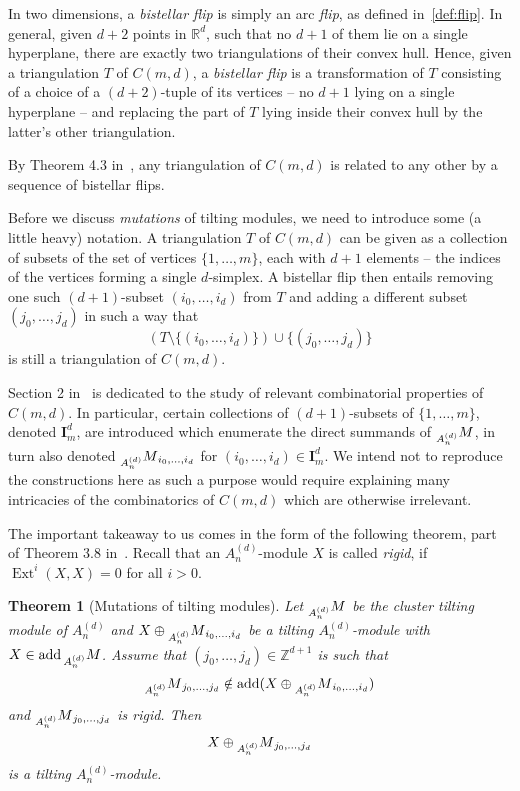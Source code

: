 \documentclass[a4paper,oneside,svgnames,draft]{amsart}
\theoremstyle{plain}
\newtheorem{theorem}{Theorem}[section]
\theoremstyle{definition}
\DeclareMathOperator{\ext}{Ext}
\DeclareMathOperator{\add}{add}
\begin{document}
 In two dimensions, a \emph{bistellar flip} is simply an arc \emph{flip}, as
 defined in~\cref{def:flip}. In general, given $d+2$ points in $\mathbb{R}^{d}$,
 such that no $d+1$ of them lie on a single hyperplane, there are exactly two
 triangulations of their convex hull. Hence, given a triangulation $T$ of
 $C(m,d)$, a \emph{bistellar flip} is a transformation of $T$ consisting of a
 choice of a $(d+2)$-tuple of its vertices -- no $d+1$ lying on a single
 hyperplane -- and replacing the part of $T$ lying inside their convex hull by
 the latter's other triangulation.

 By Theorem 4.3 in~\cite{ot}, any triangulation of $C(m,d)$ is related to any
 other by a sequence of bistellar flips.

 Before we discuss \emph{mutations} of tilting modules, we need to introduce
 some (a little heavy) notation. A triangulation $T$ of $C(m,d)$ can be given as
 a collection of subsets of the set of vertices $\{1,\ldots,m\}$, each with
 $d+1$ elements -- the indices of the vertices forming a single $d$-simplex. A
 bistellar flip then entails removing one such $(d+1)$-subset $(i_0,\ldots,i_d)$
 from $T$ and adding a different subset $(j_0,\ldots,j_d)$ in such a way that
 \[
  (T \setminus \{(i_0,\ldots,i_d)\}) \cup \{(j_0,\ldots,j_d)\}
 \]
 is still a triangulation of $C(m,d)$.

 Section 2 in~\cite{ot} is dedicated to the study of relevant combinatorial
 properties of $C(m,d)$. In particular, certain collections of $(d+1)$-subsets
 of $\{1,\ldots,m\}$, denoted $\mathbf{I}_m^{d}$, are introduced which enumerate
 the direct summands of $\prescript{}{A_n^{(d)}}M$, in turn also denoted
 $\prescript{}{A^{(d)}_n}M_{i_0,\ldots,i_d}$ for $(i_0,\ldots,i_d) \in
 \mathbf{I}_m^{d}$. We intend not to reproduce the constructions here as such a
 purpose would require explaining many intricacies of the combinatorics of
 $C(m,d)$ which are otherwise irrelevant.

 The important takeaway to us comes in the form of the following theorem, part
 of Theorem 3.8 in~\cite{ot}. Recall that an $A^{(d)}_n$-module $X$ is called
 \emph{rigid}, if $\ext^{i}(X,X) = 0$ for all $i>0$.

 \begin{theorem}[Mutations of tilting modules]
  \label{thm:tilting-modules}
  Let $\prescript{}{A^{(d)}_n}M$ be the cluster tilting module of $A^{(d)}_n$
  and $X \oplus \prescript{}{A^{(d)}_n}M_{i_0,\ldots,i_d}$ be a tilting
  $A^{(d)}_n$-module with $X \in \add \prescript{}{A^{(d)}_n}M$. Assume that
  $(j_0,\ldots,j_d) \in \mathbb{Z}^{d+1}$ is such that
  \[
   \prescript{}{A^{(d)}_n}M_{j_0,\ldots,j_d} \notin \add (X \oplus
   \prescript{}{A^{(d)}_n}M_{i_0,\ldots,i_d})
  \]
  and $\prescript{}{A^{(d)}_n}M_{j_0,\ldots,j_d}$ is rigid. Then
  \[
   X \oplus \prescript{}{A^{(d)}_n}M_{j_0,\ldots,j_d}
  \]
  is a tilting $A^{(d)}_n$-module.
 \end{theorem}
\end{document}
